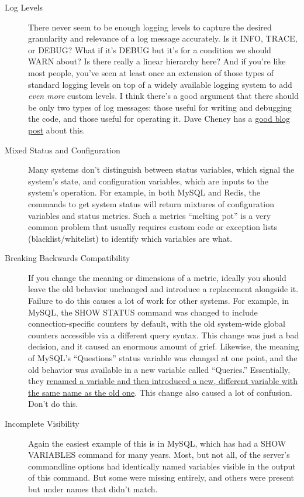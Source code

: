 \documentclass{vivid_layout}
\begin{document}
\begin{description}

\item[Log Levels] There never seem to be enough logging levels to 
capture the desired granularity and relevance of a log message accurately. Is it INFO,
TRACE, or DEBUG? What if it's DEBUG but it's for a condition we should WARN
about? Is there really a linear hierarchy here? And if you're like most people,
you've seen at least once an extension of those types of standard logging levels
on top of a widely available logging system to add \emph{even more} custom
levels. I think there's a good argument that there should be only two
types of log messages: those useful for writing and debugging the code, and
those useful for operating it. Dave Cheney has a
\href{http://dave.cheney.net/2015/11/05/lets-talk-about-logging}{good blog post}
about this.

\item[Mixed Status and Configuration] Many systems don't distinguish between
status variables, which signal the system's state, and configuration variables,
which are inputs to the system's operation. For example, in both MySQL and
Redis, the commands to get system status will return mixtures of configuration
variables and status metrics. Such a metrics ``melting pot'' is a very common problem that usually
requires custom code or exception lists (blacklist/whitelist) to identify which
variables are what.

\item[Breaking Backwards Compatibility] If you change the meaning or dimensions
of a metric, ideally you should leave the old behavior unchanged and introduce a
replacement alongside it. Failure to do this causes a lot of work for other
systems. For example, in MySQL, the SHOW STATUS command was changed to include
connection-specific counters by default, with the old system-wide global
counters accessible via a different query syntax. This change was just a bad decision,
and it caused an enormous amount of grief. Likewise, the meaning of MySQL's
``Questions'' status variable was changed at one point, and the old behavior was
available in a new variable called ``Queries.'' Essentially, they
\href{http://dev.mysql.com/doc/refman/5.0/en/server-status-variables.html#statvar\_Questions}{renamed
a variable and then introduced a new, different variable with the same name as
the old one}. This change also caused a lot of confusion. Don't do this.

\item[Incomplete Visibility] Again the easiest example of this is in MySQL,
which has had a SHOW VARIABLES command for many years. Most, but not all, of the
server's commandline options had identically named variables visible in the
output of this command. But some were missing entirely, and others were present
but under names that didn't match.


\end{description}
\end{document}
